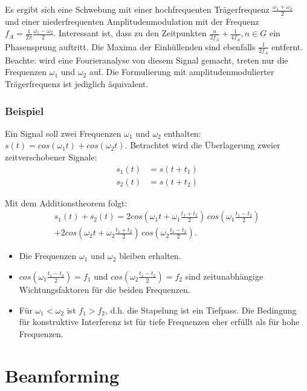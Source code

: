 Es ergibt sich eine Schwebung mit einer hochfrequenten Trägerfrequenz $\frac{\omega_1+\omega_2}{2}$ und einer niederfrequenten Amplitudenmodulation mit der Frequenz $f_A = \frac{1}{2\pi}\frac{\omega_1-\omega_2}{2}$. Interessant ist, dass zu den Zeitpunkten $\frac{n}{2f_A}+\frac{1}{4f_A}, n \in G$ ein Phasensprung auftritt. Die Maxima der Einhüllenden sind ebenfalls $\frac{1}{2f_A}$ entfernt. Beachte: wird eine Fourieranalyse von diesem Signal gemacht, treten nur die Frequenzen $\omega_1$ und $\omega_2$ auf. Die Formulierung mit amplitudenmodulierter Trägerfrequenz ist jediglich äquivalent.\\ 

\subsubsection*{Beispiel}
Ein Signal soll zwei Frequenzen $\omega_1$ und $\omega_2$ enthalten: $s(t) = cos(\omega_1t) + cos(\omega_2t)$. Betrachtet wird die Überlagerung zweier zeitverschobener Signale:
\begin{align*}
s_1(t) &=s(t+t_1)\\
s_2(t) &=s(t+t_2)
\end{align*}

Mit dem Additionstheorem folgt:
\begin{multline}
s_1(t)+s_2(t)= 2 cos\left(\omega_1 t +\omega_1\frac{t_1+t_2}{2}\right)\,cos\left(\omega_1\frac{t_1-t_2}{2}\right)\\
+2 cos\left(\omega_2 t +\omega_2\frac{t_1+t_2}{2}\right)\,cos\left(\omega_2\frac{t_1-t_2}{2}\right).
\end{multline}

\begin{itemize}
\item Die Frequenzen $\omega_1$ und $\omega_2$ bleiben erhalten.
\item $cos(\omega_1\frac{t_1-t_2}{2})=f_1$ und $cos(\omega_2\frac{t_1-t_2}{2})=f_2$ sind zeitunabhängige Wichtungsfaktoren für die beiden Frequenzen.
\item Für $\omega_1<\omega_2$ ist $f_1>f_2$, d.h. die Stapelung ist ein Tiefpass. Die Bedingung für konstruktive Interferenz ist für tiefe Frequenzen eher erfüllt als für hohe Frequenzen. 
\end{itemize}


\section{Beamforming}

